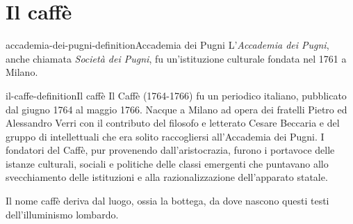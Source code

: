\documentclass[preview]{standalone}
\begin{document}
\genpage

\section{Il caffè}

\begin{snippetdefinition}{accademia-dei-pugni-definition}{Accademia dei Pugni}
    L'\textit{Accademia dei Pugni}, anche chiamata \textit{Società dei Pugni},
    fu un'istituzione culturale fondata nel 1761 a Milano.
\end{snippetdefinition}

\begin{snippetdefinition}{il-caffe-definition}{Il caffè}
    Il Caffè (1764-1766) fu un periodico italiano, pubblicato dal giugno 1764 al maggio 1766.
    Nacque a Milano ad opera dei fratelli Pietro ed Alessandro Verri con il contributo del
    filosofo e letterato Cesare Beccaria e del gruppo di intellettuali che era solito raccogliersi
    all'Accademia dei Pugni. I fondatori del Caffè, pur provenendo dall'aristocrazia,
    furono i portavoce delle istanze culturali, sociali e politiche delle classi emergenti che
    puntavano allo svecchiamento delle istituzioni e alla razionalizzazione dell'apparato statale.
\end{snippetdefinition}

\begin{plainhtml}
    Il nome caffè deriva dal luogo, ossia la bottega, da dove nascono questi testi dell'illuminismo lombardo.
\end{plainhtml}
\end{document}
